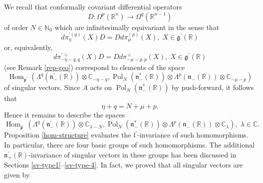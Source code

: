 \documentclass[a4paper,12pt,reqno]{amsart}
\numberwithin{theorem}{subsection}
\numberwithin{equation}{section}
\begin{document}
We recall that conformally covariant differential operators
$$
   D: \Omega^p({\mathbb{R}}^n) \to \Omega^q({\mathbb{R}}^{n-1})
$$
of order $N \in {\mathbb{N}}_0$ which are infinitesimally equivariant in the sense that
$$
   d\pi^{\prime (q)}_{\eta}(X) D = D d\pi^{(p)}_{\mu}(X), \; X \in {{\mathfrak g}}^\prime({\mathbb{R}})
$$
or, equivalently,
$$
   d \pi^{\prime {{\,\vee}}}_{-\eta-q,q}(X) D = D d\pi^{{\,\vee}}_{-\mu-p,p}(X), \; X \in {{\mathfrak g}}^\prime({\mathbb{R}})
$$
(see Remark \ref{rep-geo}) correspond to elements of the space
$$
   {\operatorname{Hom}}_{{{\mathfrak p}}^\prime}(\Lambda^q({{\mathfrak n}}_-^\prime({\mathbb{R}})) \otimes {\mathbb{C}}_{-\eta-q},
   {\operatorname{Pol}}_N({{\mathfrak n}}_-^*({\mathbb{R}})) \otimes \Lambda^p({{\mathfrak n}}_-({\mathbb{R}})) \otimes {\mathbb{C}}_{-\mu-p})
$$
of singular vectors. Since $A$ acts on ${\operatorname{Pol}}_N({{\mathfrak n}}_-^*({\mathbb{R}}))$ by push-forward,
it follows that
$$
   \eta + q = N + \mu +p.
$$
Hence it remains to describe the spaces
$$
   {\operatorname{Hom}}_{{{\mathfrak p}}^\prime}(\Lambda^q({{\mathfrak n}}_-^\prime({\mathbb{R}})) \otimes {\mathbb{C}}_{\lambda-N},
   {\operatorname{Pol}}_N({{\mathfrak n}}_-^*({\mathbb{R}})) \otimes \Lambda^p({{\mathfrak n}}_-({\mathbb{R}})) \otimes {\mathbb{C}}_{\lambda}), \;
   \lambda \in {\mathbb{C}}.
$$
Proposition \ref{hom-structure} evaluates the ${{\mathfrak l}}^\prime$-invariance of such
homomorphisms. In particular, there are four basic groups of such
homomorphisms. The additional ${{\mathfrak n}}_+^\prime({\mathbb{R}})$-invariance of singular
vectors in these groups has been discussed in Sections
\ref{sv-type1}--\ref{sv-type-4}. In fact, we proved that all singular vectors
are given by
\end{document}
